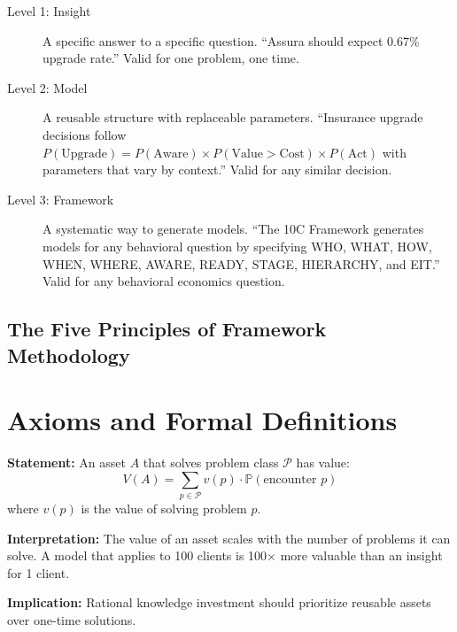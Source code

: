 \begin{description}
    \item[Level 1: Insight] A specific answer to a specific question. ``Assura should expect 0.67\% upgrade rate.'' Valid for one problem, one time.

    \item[Level 2: Model] A reusable structure with replaceable parameters. ``Insurance upgrade decisions follow $P(\text{Upgrade}) = P(\text{Aware}) \times P(\text{Value} > \text{Cost}) \times P(\text{Act})$ with parameters that vary by context.'' Valid for any similar decision.

    \item[Level 3: Framework] A systematic way to generate models. ``The 10C Framework generates models for any behavioral question by specifying WHO, WHAT, HOW, WHEN, WHERE, AWARE, READY, STAGE, HIERARCHY, and EIT.'' Valid for any behavioral economics question.
\end{description}

\subsection{The Five Principles of Framework Methodology}

\section{Axioms and Formal Definitions}
\label{sec:fm-axioms}

\begin{tcolorbox}[colback=gray!5!white, colframe=gray!75!black,
    title=Axiom FM-1: Reusability Principle]
\textbf{Statement:} An asset $A$ that solves problem class $\mathcal{P}$ has value:
\begin{equation}
V(A) = \sum_{p \in \mathcal{P}} v(p) \cdot \mathbb{P}(\text{encounter } p)
\end{equation}
where $v(p)$ is the value of solving problem $p$.

\textbf{Interpretation:} The value of an asset scales with the number of problems it can solve. A model that applies to 100 clients is 100$\times$ more valuable than an insight for 1 client.

\textbf{Implication:} Rational knowledge investment should prioritize reusable assets over one-time solutions.
\end{tcolorbox}

